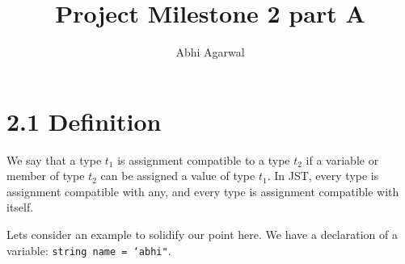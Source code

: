 \documentclass[11pt, oneside]{article}
\title{Project Milestone 2 part A}
\author{Abhi Agarwal}
\date{}
\begin{document}
\maketitle
\section{2.1 Definition}

\par We say that a type $t_1$ is assignment compatible to a type $t_2$ if a variable or member of type $t_2$ can be assigned a value of type $t_1$. In JST, every type is assignment compatible with any, and every type is assignment compatible with itself.

\par Lets consider an example to solidify our point here. We have a declaration of a variable: \texttt{string name = `abhi"}. 

\section{}
\end{document}
